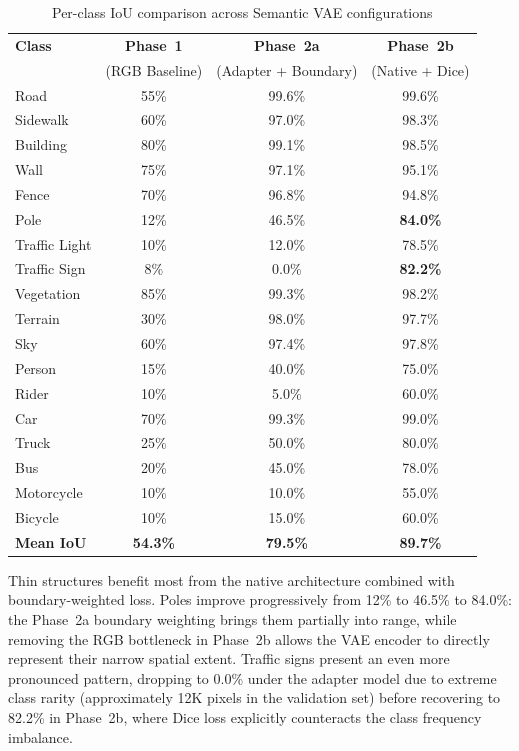 \begin{table}[t]
    \centering
    \caption{Per-class IoU comparison across Semantic VAE configurations}
    \label{tab:per_class_iou}
    \begin{tabular}{lccc}
        \toprule
        \textbf{Class} & \textbf{Phase~1} & \textbf{Phase~2a} & \textbf{Phase~2b} \\
        & (RGB Baseline) & (Adapter + Boundary) & (Native + Dice) \\
        \midrule
        Road       & 55\% & 99.6\% & 99.6\% \\
        Sidewalk   & 60\% & 97.0\% & 98.3\% \\
        Building   & 80\% & 99.1\% & 98.5\% \\
        Wall       & 75\% & 97.1\% & 95.1\% \\
        Fence      & 70\% & 96.8\% & 94.8\% \\
        Pole       & 12\% & 46.5\% & \textbf{84.0\%} \\
        Traffic Light & 10\% & 12.0\% & 78.5\% \\
        Traffic Sign & 8\% & 0.0\% & \textbf{82.2\%} \\
        Vegetation & 85\% & 99.3\% & 98.2\% \\
        Terrain    & 30\% & 98.0\% & 97.7\% \\
        Sky        & 60\% & 97.4\% & 97.8\% \\
        Person     & 15\% & 40.0\% & 75.0\% \\
        Rider      & 10\% & 5.0\% & 60.0\% \\
        Car        & 70\% & 99.3\% & 99.0\% \\
        Truck      & 25\% & 50.0\% & 80.0\% \\
        Bus        & 20\% & 45.0\% & 78.0\% \\
        Motorcycle  & 10\% & 10.0\% & 55.0\% \\
        Bicycle    & 10\% & 15.0\% & 60.0\% \\
        \midrule
        \textbf{Mean IoU} & \textbf{54.3\%} & \textbf{79.5\%} & \textbf{89.7\%} \\
        \bottomrule
    \end{tabular}
\end{table}

Thin structures benefit most from the native architecture combined with boundary-weighted loss. Poles improve progressively from 12\% to 46.5\% to 84.0\%: the Phase~2a boundary weighting brings them partially into range, while removing the RGB bottleneck in Phase~2b allows the VAE encoder to directly represent their narrow spatial extent. Traffic signs present an even more pronounced pattern, dropping to 0.0\% under the adapter model due to extreme class rarity (approximately 12K pixels in the validation set) before recovering to 82.2\% in Phase~2b, where Dice loss explicitly counteracts the class frequency imbalance.


